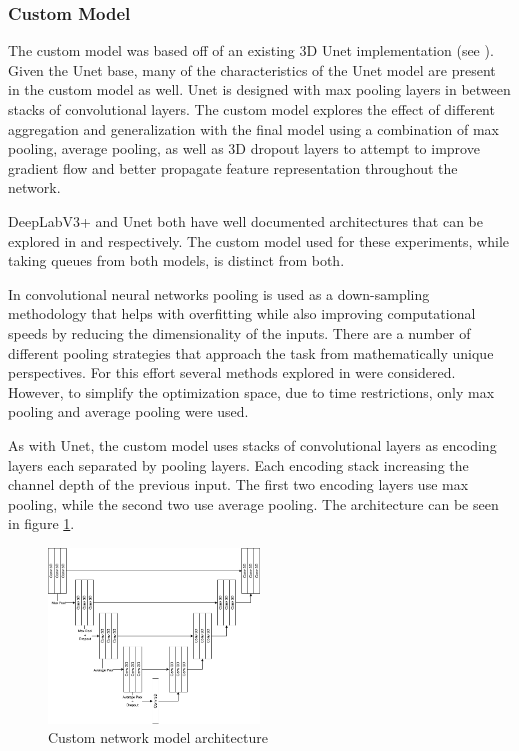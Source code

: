 \documentclass[10pt,twocolumn,letterpaper]{article}
\begin{document}
\subsubsection{Custom Model}

The custom model was based off of an existing 3D Unet implementation (see \cite{10.7554/eLife.57613}). Given the Unet base, many of the characteristics of the Unet model are present in the custom model as well. Unet is designed with max pooling layers in between stacks of convolutional layers. The custom model explores the effect of different aggregation and generalization with the final model using a combination of max pooling, average pooling, as well as 3D dropout layers to attempt to improve gradient flow and better propagate feature representation throughout the network.

DeepLabV3+ and Unet both have well documented architectures that can be explored in \cite{https://doi.org/10.48550/arxiv.1802.02611} and \cite{https://doi.org/10.48550/arxiv.1505.04597} respectively. The custom model used for these experiments, while taking queues from both models, is distinct from both.

In convolutional neural networks pooling is used as a down-sampling methodology that helps with overfitting while also improving computational speeds by reducing the dimensionality of the inputs. There are a number of different pooling strategies that approach the task from mathematically unique perspectives. For this effort several methods explored in \cite{https://doi.org/10.48550/arxiv.2009.07485} were considered. However, to simplify the optimization space, due to time restrictions, only max pooling and average pooling were used.

As with Unet, the custom model uses stacks of convolutional layers as encoding layers each separated by pooling layers. Each encoding stack increasing the channel depth of the previous input. The first two encoding layers use max pooling, while the second two use average pooling. The architecture can be seen in figure \ref{fig:custom-model-arch}.

\begin{figure}[h]
\centering
\includegraphics[width=0.5\textwidth]{figures/custom-model.png}
\caption{Custom network model architecture}
\label{fig:custom-model-arch}
\end{figure}
\end{document}

